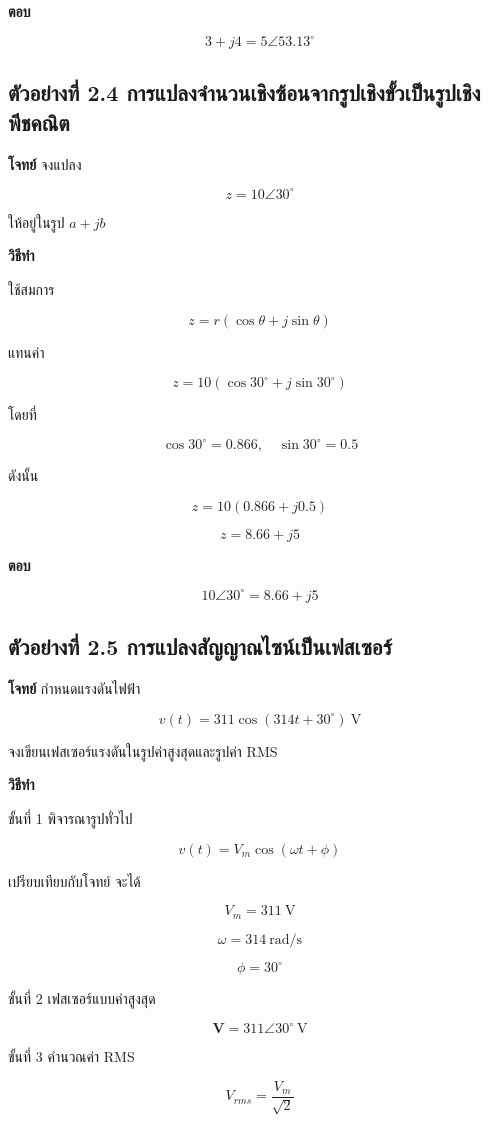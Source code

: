 \textbf{ตอบ}

\[
3+j4=5\angle 53.13^\circ
\]

\subsection*{ตัวอย่างที่ 2.4 การแปลงจำนวนเชิงซ้อนจากรูปเชิงขั้วเป็นรูปเชิงพีชคณิต}

\textbf{โจทย์}  
จงแปลง

\[
z=10\angle 30^\circ
\]

ให้อยู่ในรูป $a+jb$

\textbf{วิธีทำ}

ใช้สมการ

\[
z=r(\cos\theta+j\sin\theta)
\]

แทนค่า

\[
z=10(\cos30^\circ+j\sin30^\circ)
\]

โดยที่

\[
\cos30^\circ=0.866,\quad \sin30^\circ=0.5
\]

ดังนั้น

\[
z=10(0.866+j0.5)
\]

\[
z=8.66+j5
\]

\textbf{ตอบ}

\[
10\angle30^\circ=8.66+j5
\]

\subsection*{ตัวอย่างที่ 2.5 การแปลงสัญญาณไซน์เป็นเฟสเซอร์}

\textbf{โจทย์}  
กำหนดแรงดันไฟฟ้า

\[
v(t)=311\cos(314t+30^\circ)\ \text{V}
\]

จงเขียนเฟสเซอร์แรงดันในรูปค่าสูงสุดและรูปค่า RMS

\textbf{วิธีทำ}

ขั้นที่ 1 พิจารณารูปทั่วไป

\[
v(t)=V_m\cos(\omega t+\phi)
\]

เปรียบเทียบกับโจทย์ จะได้

\[
V_m=311\ \text{V}
\]

\[
\omega=314\ \text{rad/s}
\]

\[
\phi=30^\circ
\]

ขั้นที่ 2 เฟสเซอร์แบบค่าสูงสุด

\[
\mathbf{V}=311\angle30^\circ\ \text{V}
\]

ขั้นที่ 3 คำนวณค่า RMS

\[
V_{rms}=\frac{V_m}{\sqrt{2}}
\]


